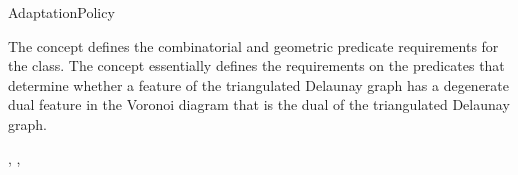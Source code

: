 


\begin{ccRefConcept}{AdaptationPolicy}

\ccDefinition

The concept  defines the combinatorial and
geometric predicate requirements for the
 class. The
 concept essentially defines the requirements on
the predicates that determine whether a feature of the triangulated
Delaunay graph has a degenerate dual feature in the Voronoi diagram
that is the dual of the triangulated Delaunay graph.

\ccRefines
{}, , 


\end{ccRefConcept}
